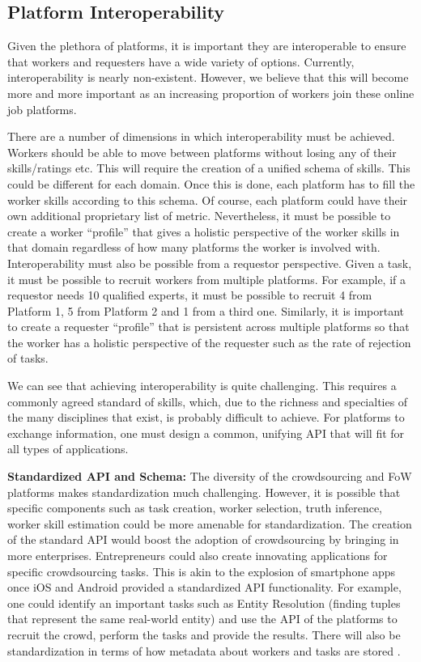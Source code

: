 \subsection{Platform Interoperability}
Given the plethora of platforms, it is important they are interoperable to ensure that
workers and requesters have a wide variety of options.
Currently, interoperability is nearly non-existent.
However, we believe that this will become more and more important
as an increasing proportion of workers join these online job platforms.

There are a number of dimensions in which interoperability must be achieved.
Workers should be able to move between platforms without losing any of their skills/ratings etc.
This will require the creation of a unified schema of skills. This could be different for each domain.
Once this is done, each platform has to fill the worker skills according to this schema.
Of course, each platform could have their own additional proprietary list of metric.
Nevertheless, it must be possible to create a worker ``profile'' that gives a holistic
perspective of the worker skills in that domain regardless of how many platforms the
worker is involved with.
Interoperability must also be possible from a requestor perspective. Given a task, it must be
possible to recruit workers from multiple platforms.
For example, if a requestor needs 10 qualified experts, it must be possible to
recruit 4 from Platform 1, 5 from Platform 2 and 1 from a third one.
Similarly, it is important to create a requester ``profile'' that is persistent across multiple platforms
so that the worker has a holistic perspective of the requester such as the rate of rejection of tasks. 

We can see that achieving interoperability is quite challenging.
This requires a commonly agreed standard of skills, which,
due to the richness and specialties of the many disciplines that
exist, is probably difficult to achieve.
For platforms to exchange information, one must design a common, unifying API
that will fit for all types of applications.

\textbf{Standardized API and Schema:} 
The diversity of the crowdsourcing and FoW platforms makes standardization much challenging.
However, it is possible that specific components such as task creation, worker selection, truth inference, worker skill estimation
could be more amenable for standardization.
The creation of the standard API would boost the adoption of crowdsourcing by bringing in more enterprises.
Entrepreneurs could also create innovating applications for specific crowdsourcing tasks.
This is akin to the explosion of smartphone apps once iOS and Android provided a standardized API functionality.
For example, one could identify an important tasks such as Entity Resolution (finding tuples that represent the same real-world entity)
and use the API of the platforms to recruit the crowd, perform the tasks and provide the results. 
There will also be standardization in terms of how metadata about workers and tasks are stored \cite{DBLP:books/daglib/0031391,DBLP:journals/www/SchallSP14}.

